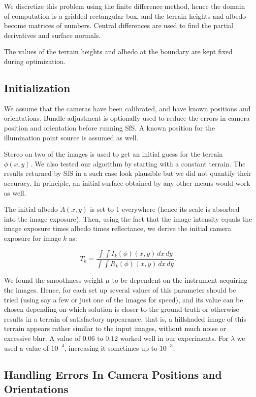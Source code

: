 \documentclass[12pt,oneside]{article}
\begin{document}
We discretize this problem using the finite difference method, hence the
domain of computation is a gridded rectangular box, and the terrain heights and
albedo become matrices of numbers. Central differences are used to find
the partial derivatives and surface normals.

The values of the terrain heights and albedo at the boundary are 
kept fixed during optimization.

\subsection{Initialization}

We assume that the cameras have been calibrated, and have known
positions and orientations. Bundle adjustment is optionally used to
reduce the errors in camera position and orientation before running
SfS. A known position for the illumination point source is assumed as
well.

Stereo on two of the images is used to get an initial guess for the
terrain $\phi(x, y).$ We also tested our algorithm by starting
with a constant terrain. The results returned by SfS in a such case look
plausible but we did not quantify their accuracy. In principle,
an initial surface obtained by any other means would work as well.

The initial albedo $A(x, y)$ is set to 1 everywhere (hence
its scale is absorbed into the image exposure). Then, using the fact that
the image intensity equals the image exposure times albedo times
reflectance, we derive the initial camera exposure for image $k$ as:

$$
T_k = \frac{ \int\!\! \int \! I_k(\phi)(x, y) \,dx\,dy }{ \int\!\! \int \! R_k(\phi)(x, y) \,dx\,dy}.
$$

We found the smoothness weight $\mu$ to be dependent on the instrument
acquiring the images. Hence, for each set up several values of
this parameter should be tried (using say a few or just one of the
images for speed), and its value can be chosen depending on which
solution is closer to the ground truth or otherwise results in a terrain
of satisfactory appearance, that is, a hillshaded image of this terrain
appears rather similar to the input images, without much noise or
excessive blur. A value of $0.06$ to $0.12$ worked well in our experiments.
For $\lambda$ we used a value of $10^{-4}$, increasing it sometimes up to $10^{-3}.$

\subsection{Handling Errors In Camera Positions and Orientations}
\label{multires}
\end{document}
